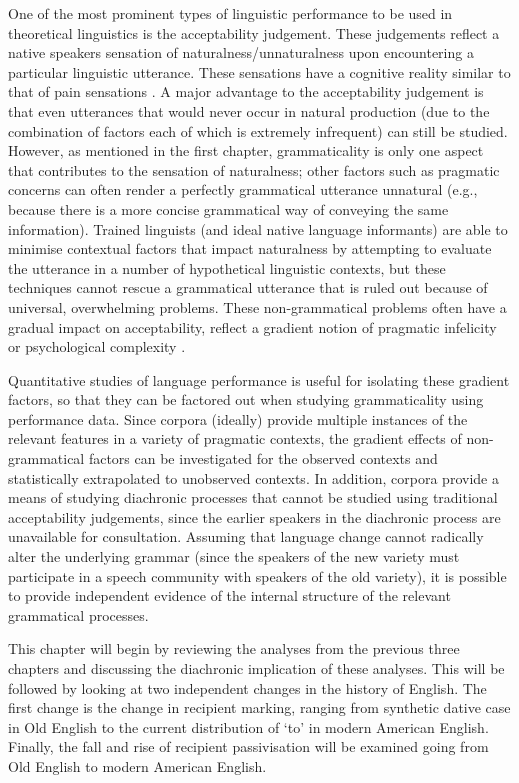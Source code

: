 One of the most prominent types of linguistic performance to be used in theoretical linguistics is the acceptability judgement. These judgements reflect a native speakers sensation of naturalness/unnaturalness upon encountering a particular linguistic utterance. These sensations have a cognitive reality similar to that of pain sensations \citep{Schutze.2014}. A major advantage to the acceptability judgement is that even utterances that would never occur in natural production (due to the combination of factors each of which is extremely infrequent) can still be studied. However, as mentioned in the first chapter, grammaticality is only one aspect that contributes to the sensation of naturalness; other factors such as pragmatic concerns can often render a perfectly grammatical utterance unnatural (e.g., because there is a more concise grammatical way of conveying the same information). Trained linguists (and ideal native language informants) are able to minimise contextual factors that impact naturalness by attempting to evaluate the utterance in a number of hypothetical linguistic contexts, but these techniques cannot rescue a grammatical utterance that is ruled out because of universal, overwhelming problems. These non-grammatical problems often have a gradual impact on acceptability, reflect a gradient notion of pragmatic infelicity or psychological complexity \citep{Bresnan.2007,Bresnan.2010,Schutze.2014}.

Quantitative studies of language performance is useful for isolating these gradient factors, so that they can be factored out when studying grammaticality using performance data. Since corpora (ideally) provide multiple instances of the relevant features in a variety of pragmatic contexts, the gradient effects of non-grammatical factors can be investigated for the observed contexts and statistically extrapolated to unobserved contexts. In addition, corpora provide a means of studying diachronic processes that cannot be studied using traditional acceptability judgements, since the earlier speakers in the diachronic process are unavailable for consultation. Assuming that language change cannot radically alter the underlying grammar (since the speakers of the new variety must participate in a speech community with speakers of the old variety), it is possible to provide independent evidence of the internal structure of the relevant grammatical processes.

This chapter will begin by reviewing the analyses from the previous three chapters and discussing the diachronic implication of these analyses. This will be followed by looking at two independent changes in the history of English. The first change is the change in recipient marking, ranging from synthetic dative case in Old English to the current distribution of `to' in modern American English. Finally, the fall and rise of recipient passivisation will be examined going from Old English to modern American English.

